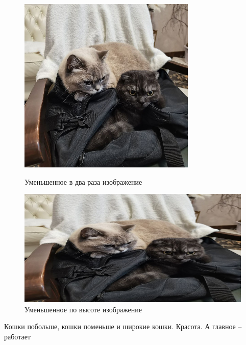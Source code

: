 \documentclass[a4paper, 16pt]{article}
\begin{document}
\begin{figure}[!htb]
    \centering
    \begin{minipage}{0.45\textwidth}
        \centering
        \includegraphics[scale=0.3]{scaled_img_smaller.png}
        \captionsetup{skip=0pt}
        \caption{Уменьшенное в два раза изображение}
        \label{Рис:6}
    \end{minipage}\hfill
    \begin{minipage}{0.45\textwidth}
        \centering
        \includegraphics[scale=0.3]{scaled_img_wtf.png}
        \captionsetup{skip=0pt}
        \caption{Уменьшенное по высоте изображение}
        \label{Рис:7}
    \end{minipage}
\end{figure}


\noindent Кошки побольше, кошки поменьше и широкие кошки. Красота. А главное -- работает
\end{document}
